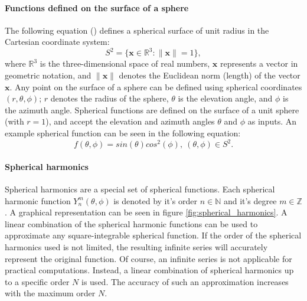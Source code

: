 \paragraph*{Functions defined on the surface of a sphere}
The following equation (\cite{rafaely_spherical_array_processing}) defines a spherical surface of unit radius in the Cartesian coordinate system:
\begin{equation}
        S^2 = \{\bm{x} \in \mathbb{R}^3: \lVert \bm{x} \rVert = 1\},
\end{equation}
where $\mathbb{R}^3$ is the three-dimensional space of real numbers, $\bm{x}$ represents a vector in
geometric notation, and $\lVert \bm{x} \rVert$ denotes the Euclidean norm (length) of the vector $\bm{x}$.
Any point on the surface of a sphere can be defined using spherical coordinates $(r, \theta, \phi)$; $r$ denotes the radius of the sphere, 
$\theta$ is the elevation angle, and $\phi$ is the azimuth angle.
Spherical functions are defined on the surface of a unit sphere (with $r=1$),
and accept the elevation and azimuth angles $\theta$ and $\phi$ as inputs. \cite{rafaely_spherical_array_processing}
An example spherical function can be seen in the following equation:
\begin{equation}
    f(\theta, \phi) = sin(\theta)cos^2(\phi),\ (\theta, \phi) \in S^2.
\end{equation}

\paragraph*{Spherical harmonics}
Spherical harmonics are a special set of spherical functions.
Each spherical harmonic function $Y^m_n(\theta, \phi)$ is denoted by it's order $n \in \mathbb{N}$
and it's degree $m \in \mathbb{Z}$. A graphical representation can be seen in figure \ref{fig:spherical_harmonics}.
A linear combination of the spherical harmonic 
functions can be used to approximate any square-integrable spherical function.
If the order of the spherical harmonics used is not limited, the resulting infinite series will 
accurately represent the original function. \cite{ambi_practical_theory_infinite_series_approximation}
Of course, an infinite series is not applicable for practical computations. 
Instead, a linear combination of spherical harmonics up to a specific order $N$ is used.
The accuracy of such an approximation increases with the maximum order $N$. 

